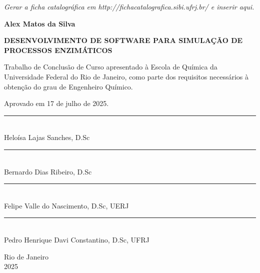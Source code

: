 \documentclass[12pt,oneside]{report}
\begin{document}
\newpage
{}
\vspace*{\fill}
\begin{center}
    \textit{Gerar a ficha catalográfica em http://fichacatalografica.sibi.ufrj.br/ e inserir aqui.}
\end{center}
\vspace*{\fill}
\newpage

\begin{center}
    \textbf{Alex Matos da Silva}

    \vspace{1cm}

    \textbf{DESENVOLVIMENTO DE SOFTWARE PARA SIMULAÇÃO DE PROCESSOS ENZIMÁTICOS}

    \vspace{0.5cm}

    \begin{adjustwidth}{8cm}{0cm}
        Trabalho de Conclusão de Curso apresentado à Escola de Química da Universidade Federal do Rio de Janeiro, como parte dos requisitos necessários à obtenção do grau de Engenheiro Químico.
    \end{adjustwidth}

    \vspace{0.5cm}

\end{center}

Aprovado em 17 de julho de 2025.

\begin{center}

    \vspace{2cm}

    \noindent\rule{10cm}{0.4pt}\\
    \noindent\hspace*{0.2cm}Heloísa Lajas Sanches, D.Sc

    \vspace{1cm}

    \noindent\rule{10cm}{0.4pt}\\
    \noindent\hspace*{0.2cm}Bernardo Dias Ribeiro, D.Sc

    \vspace{2cm}

    \noindent\rule{10cm}{0.4pt}\\
    \noindent\hspace*{0.2cm}Felipe Valle do Nascimento, D.Sc, UERJ

    \vspace{1cm}

    \noindent\rule{10cm}{0.4pt}\\
    \noindent\hspace*{0.2cm}Pedro Henrique Davi Constantino, D.Sc, UFRJ


    \vfill

    Rio de Janeiro \\
    2025
\end{center}
\newpage
\end{document}
